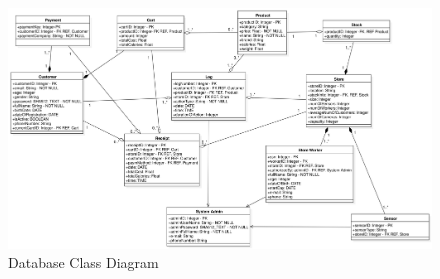 \documentclass[11pt]{article}
\begin{document}
    \begin{center}
        \begin{figure}[H]
            \includegraphics[width=\linewidth]{Images/DatabaseClassDiagram.png}
            \caption{Database Class Diagram}
            \label{dcd}
        \end{figure}
    \end{center}
\end{document}

